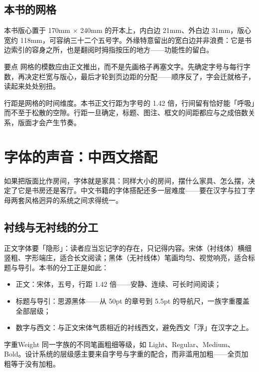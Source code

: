 \documentclass{bookedge}
\begin{document}
\section{本书的网格}

本书版心置于 170mm $\times$ 240mm 的开本上，内白边 21mm、外白边 31mm，版心宽约 118mm，可容纳三十二个五号字。外缘特意留出的宽白边并非浪费：它是书边索引的容身之所，也是翻阅时拇指按压的地方——功能性的留白。

\begin{notebox}{要点}
网格的模数应由正文推出，而不是先画格子再塞文字。先确定字号与每行字数，再决定栏宽与版心，最后才轮到页边距的分配——顺序反了，字会迁就格子，读起来处处别扭。
\end{notebox}

行距是网格的时间维度。本书正文行距为字号的 1.42 倍，行间留有恰好能「呼吸」而不至于松散的空隙。行距一旦确定，标题、图注、框文的间距都应与之成倍数关系，版面才会产生节奏。

\chapter{字体的声音：中西文搭配}

如果把版面比作房间，字体就是家具：同样大小的房间，摆什么家具、怎么摆，决定了它是书房还是客厅。中文书籍的字体搭配还多一层难度——要在汉字与拉丁字母两套风格迥异的系统之间求得统一。

\section{衬线与无衬线的分工}

正文字体要「隐形」：读者应当忘记字的存在，只记得内容。宋体（衬线体）横细竖粗、字形端庄，适合长文阅读；黑体（无衬线体）笔画均匀、视觉响亮，适合标题与导引。本书的分工正是如此：

\begin{itemize}
  \item 正文：宋体，五号，行距 1.42 倍——安静、连续、可长时间阅读；
  \item 标题与导引：思源黑体——从 50pt 的章号到 5.5pt 的导航尺，一族字重覆盖全部层级；
  \item 数字与西文：与正文宋体气质相近的衬线西文，避免西文「浮」在汉字之上。
\end{itemize}

\begin{entry}{字重}{Weight}
同一字族的不同笔画粗细等级，如 Light、Regular、Medium、Bold。设计系统的层级感主要来自字号与字重的配合，而非滥用加粗——全页加粗等于没有加粗。
\end{entry}
\end{document}

